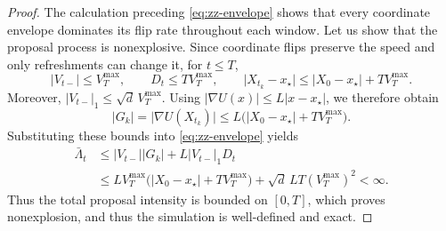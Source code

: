 \documentclass{amsart}
\theoremstyle{plain}
\theoremstyle{definition}
\theoremstyle{remark}
\newcommand{\abs}[1]{\lvert#1\rvert}
\newcommand{\1}{\mathbf 1}
\begin{document}
\begin{proof}
The calculation preceding \eqref{eq:zz-envelope} shows that every coordinate
envelope dominates its flip rate throughout each window.
Let us show that the proposal process is nonexplosive.  Since coordinate flips
preserve the speed and only refreshments can change it, for $t\le T$,
\[
        \abs{V_{t-}}\le V_T^{\max},
        \qquad
        D_t\le T V_T^{\max},
        \qquad
        \abs{X_{t_k}-x_\star}
        \le\abs{X_0-x_\star}+T V_T^{\max}.
\]
Moreover, $\abs{V_{t-}}_1\le\sqrt d\,V_T^{\max}$.  Using
$\abs{\nabla U(x)}\le L\abs{x-x_\star}$, we therefore obtain
\[
        \abs{G_k}
        =\abs{\nabla U(X_{t_k})}
        \le L\bigl(\abs{X_0-x_\star}+T V_T^{\max}\bigr).
\]
Substituting these bounds into \eqref{eq:zz-envelope} yields
\[
\begin{aligned}
        \bar\Lambda_t
        &\le\abs{V_{t-}}\abs{G_k}
             +L\abs{V_{t-}}_1D_t\\
        &\le L V_T^{\max}
             \bigl(\abs{X_0-x_\star}+T V_T^{\max}\bigr)
             +\sqrt d\,LT(V_T^{\max})^2<\infty.
\end{aligned}
\]
Thus the total proposal intensity is bounded on $[0,T]$, which proves
nonexplosion, and thus the simulation is well-defined and exact.


\end{proof}
\end{document}
